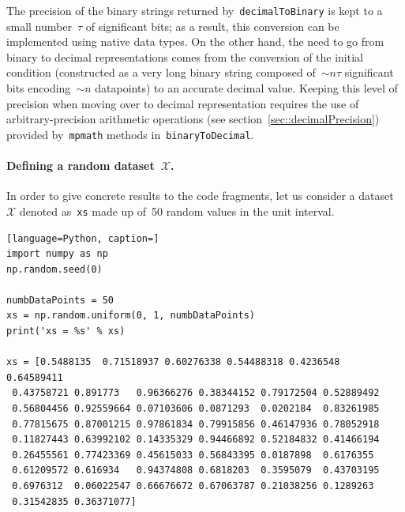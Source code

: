 \documentclass{article}
\begin{document}
\begin{appendices}
\noindent The precision of the binary strings returned by~\texttt{decimalToBinary} is kept to a small number~$\tau$ of significant bits;  as a result, this conversion can be implemented using native data types.  On the other hand, the need to go from binary to decimal representations comes from the conversion of the initial condition (constructed as a very long binary string composed of~$\sim n\tau$ significant bits encoding~$\sim n$ datapoints) to an accurate decimal value.  Keeping this level of precision when moving over to decimal representation requires the use of arbitrary-precision arithmetic operations (see section~\ref{sec::decimalPrecision}) provided by~\texttt{mpmath} methods in~\texttt{binaryToDecimal}.

\paragraph{Defining a random dataset~$\mathcal{X}$.}  In order to give concrete results to the code fragments, let us consider a dataset~$\mathcal{X}$ denoted as~\texttt{xs} made up of~50 random values in the unit interval. \\

\begin{lstlisting}[language=Python, caption=]
import numpy as np
np.random.seed(0)

numbDataPoints = 50
xs = np.random.uniform(0, 1, numbDataPoints)
print('xs = %s' % xs)

xs = [0.5488135  0.71518937 0.60276338 0.54488318 0.4236548  0.64589411
 0.43758721 0.891773   0.96366276 0.38344152 0.79172504 0.52889492
 0.56804456 0.92559664 0.07103606 0.0871293  0.0202184  0.83261985
 0.77815675 0.87001215 0.97861834 0.79915856 0.46147936 0.78052918
 0.11827443 0.63992102 0.14335329 0.94466892 0.52184832 0.41466194
 0.26455561 0.77423369 0.45615033 0.56843395 0.0187898  0.6176355
 0.61209572 0.616934   0.94374808 0.6818203  0.3595079  0.43703195
 0.6976312  0.06022547 0.66676672 0.67063787 0.21038256 0.1289263
 0.31542835 0.36371077]

\end{lstlisting}

\end{appendices}

\newpage
\end{document}
